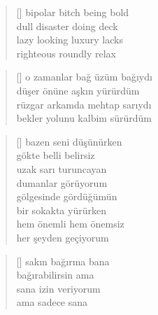 \documentclass[10pt, openright, twoside]{memoir}
\theoremstyle{definition}
\begin{document}
\vspace*{\fill}
%
\newpage
{}
\vspace*{\fill}
\settowidth{\versewidth}{lazy looking luxury lacks}
\begin{verse}[\versewidth]
  bipolar bitch being bold \\
  dull disaster doing deck \\
  lazy looking luxury lacks \\
  righteous roundly relax
\end{verse}
\vspace*{\fill}
%
\newpage
{}
\vspace*{\fill}
\settowidth{\versewidth}{rüzgar arkamda mehtap sarıydı}
\begin{verse}[\versewidth]
  o zamanlar bağ üzüm bağıydı \\
  düşer önüne aşkın yürürdüm \\
  rüzgar arkamda mehtap sarıydı \\
  bekler yolunu kalbim sürürdüm
\end{verse}
\vspace*{\fill}
%
\newpage
{}
\vspace*{\fill}
\settowidth{\versewidth}{hem önemli hem önemsiz}
\begin{verse}[\versewidth]
  bazen seni düşünürken \\
  gökte belli belirsiz \\
  uzak sarı turuncayan \\
  dumanlar görüyorum \\
  gölgesinde gördüğümün \\
  bir sokakta yürürken \\
  hem önemli hem önemsiz \\
  her şeyden geçiyorum
\end{verse}
\vspace*{\fill}
%
\newpage
{}
\vspace*{\fill}
\settowidth{\versewidth}{sana izin veriyorum}
\begin{verse}[\versewidth]
  sakın bağırma bana \\
  bağırabilirsin ama \\
  sana izin veriyorum \\
  ama sadece sana
\end{verse}
\end{document}

